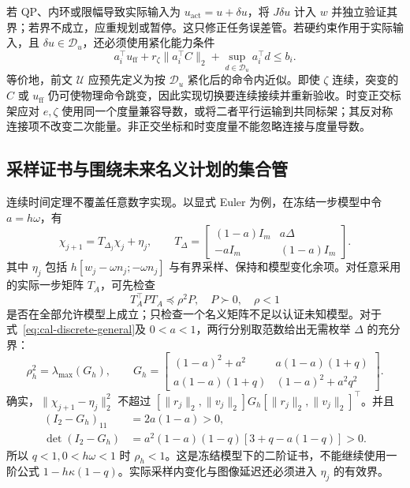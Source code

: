 \documentclass[11pt,a4paper]{article}
\numberwithin{equation}{section}
\theoremstyle{definition}
\begin{document}
若 QP、内环或限幅导致实际输入为 $u_{\mathrm{act}}=u+\delta u$，将 $J\delta u$ 计入 $w$ 并独立验证其界；若界不成立，应重规划或暂停。这只修正任务误差管。若硬约束作用于实际输入，且 $\delta u\in\mathcal D_u$，还必须使用紧化能力条件
\begin{equation}
 a_i^\top u_{\mathrm{ff}}+r_\zeta\|a_i^\top C\|_2
 +\sup_{d\in\mathcal D_u}a_i^\top d\le b_i.
\end{equation}
等价地，前文 $\mathcal U$ 应预先定义为按 $\mathcal D_u$ 紧化后的命令内近似。即使 $\zeta$ 连续，突变的 $C$ 或 $u_{\mathrm{ff}}$ 仍可使物理命令跳变，因此实现切换要连续接续并重新验收。时变正交标架应对 $e,\zeta$ 使用同一个度量兼容导数，或将二者平行运输到共同标架；其反对称连接项不改变二次能量。非正交坐标和时变度量不能忽略连接与度量导数。

\subsection{采样证书与围绕未来名义计划的集合管}

连续时间定理不覆盖任意数字实现。以显式 Euler 为例，在冻结一步模型中令 $a=h\omega$，有
\begin{equation}
 \chi_{j+1}=T_{\Delta_j}\chi_j+\eta_j,\qquad
 T_\Delta=
 \begin{bmatrix}(1-a)I_m&a\Delta\\-aI_m&(1-a)I_m\end{bmatrix}.
 \label{eq:cal-discrete-general}
\end{equation}
其中 $\eta_j$ 包括 $h[w_j-\omega n_j;-\omega n_j]$ 与有界采样、保持和模型变化余项。对任意采用的实际一步矩阵 $T_A$，可先检查
\begin{equation}
 T_A^\top P T_A\preceq\rho^2P,
 \quad P\succ0,\quad\rho<1
 \label{eq:cal-discrete-matrix-certificate}
\end{equation}
是否在全部允许模型上成立；只检查一个名义矩阵不足以认证未知模型。对于式~\eqref{eq:cal-discrete-general}及 $0<a<1$，两行分别取范数给出无需枚举 $\Delta$ 的充分界：
\begin{equation}
 \rho_h^2=\lambda_{\max}(G_h),\qquad
 G_h=\begin{bmatrix}
 (1-a)^2+a^2&a(1-a)(1+q)\\
 a(1-a)(1+q)&(1-a)^2+a^2q^2
 \end{bmatrix}.
 \label{eq:cal-discrete-rho}
\end{equation}
确实，$\|\chi_{j+1}-\eta_j\|_2^2$ 不超过
$[\|r_j\|_2,\|v_j\|_2]G_h[\|r_j\|_2,\|v_j\|_2]^\top$。并且
\begin{align}
 (I_2-G_h)_{11}&=2a(1-a)>0,\\
 \det(I_2-G_h)&=a^2(1-a)(1-q)
                   [3+q-a(1-q)]>0.
\end{align}
所以 $q<1,0<h\omega<1$ 时 $\rho_h<1$。这是冻结模型下的二阶证书，不能继续使用一阶公式 $1-h\kappa(1-q)$。实际采样内变化与图像延迟还必须进入 $\eta_j$ 的有效界。
\end{document}

